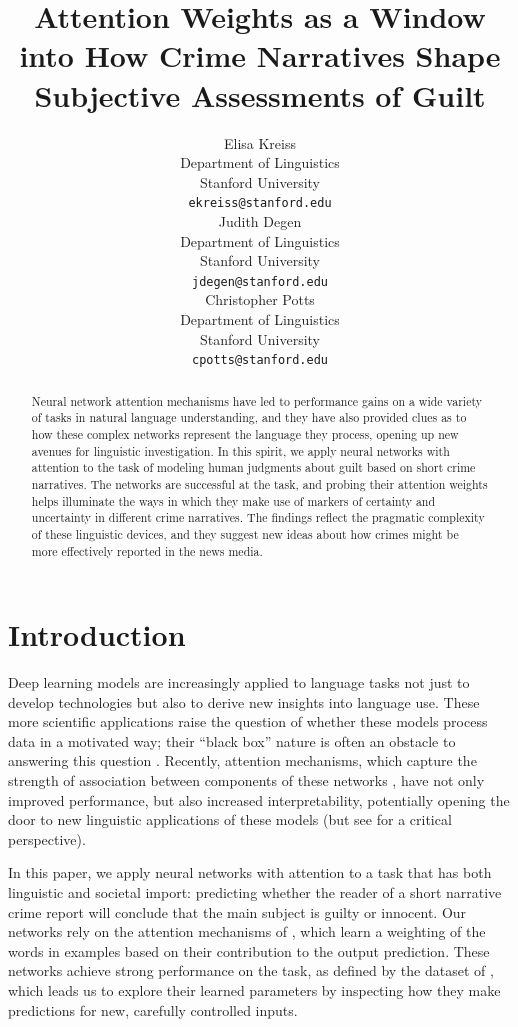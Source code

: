 \documentclass[11pt,a4paper]{article}
\title{Attention Weights as a Window into How Crime Narratives Shape Subjective Assessments of Guilt}
\author{Elisa Kreiss \\
  Department of Linguistics \\
  Stanford University \\
  \texttt{ekreiss@stanford.edu} \\\And
  Judith Degen \\
  Department of Linguistics \\
  Stanford University \\
  \texttt{jdegen@stanford.edu} \\\And
  Christopher Potts \\
  Department of Linguistics \\
  Stanford University \\
  \texttt{cpotts@stanford.edu}\\}
\date{}
\begin{document}
\maketitle
\begin{abstract}
  Neural network attention mechanisms have led to performance gains on a wide variety of tasks in natural language understanding, and they have also provided clues as to how these complex networks represent the language they process, opening up new avenues for linguistic investigation. In this spirit, we apply neural networks with attention to the task of modeling human judgments about guilt based on short crime narratives. The networks are successful at the task, and probing their attention weights helps illuminate the ways in which they make use of markers of certainty and uncertainty in different crime narratives. The findings reflect the pragmatic complexity of these linguistic devices, and they suggest new ideas about how crimes might be more effectively reported in the news media.
\end{abstract}

\section{Introduction}

Deep learning models are increasingly applied to language tasks not just to develop technologies but also to derive new insights into language use. These more scientific applications raise the question of whether these models process data in a motivated way; their ``black box'' nature is often an obstacle to answering this question \citep{Alishah-etal:2019}. Recently, attention mechanisms, which capture the strength of association between components of these networks \citep{bahdanau2014neural,luong-etal-2015-effective}, have not only improved performance, but also increased interpretability, potentially opening the door to new linguistic applications of these models (but see \citealt{Serrano:2019} for a critical perspective).

In this paper, we apply neural networks with attention to a task that has both linguistic and societal import: predicting whether the reader of a short narrative crime report will conclude that the main subject is guilty or innocent. Our networks rely on the attention mechanisms of \citet{Lin:2017}, which learn a weighting of the words in examples based on their contribution to the output prediction. These networks achieve strong performance on the task, as defined by the dataset of \citet{Kreiss:2019}, which leads us to explore their learned parameters by inspecting how they make predictions for new, carefully controlled inputs.
\end{document}
